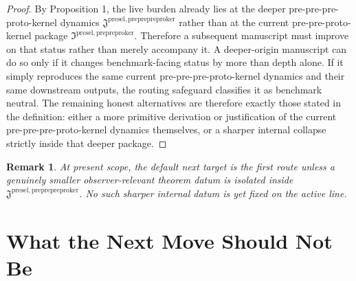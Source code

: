 \documentclass[11pt]{article}
\newcommand{\PrePrePreProtoKernelPackage}{\mathfrak J^{\mathrm{presel,preprepreproker}}}
\newcommand{\PrePreProtoKernelPackage}{\mathfrak I^{\mathrm{presel,prepreproker}}}
\newtheorem{remark}{Remark}
\begin{document}
\begin{proof}
By Proposition 1, the live burden already lies at the deeper pre-pre-pre-proto-kernel dynamics \(\PrePrePreProtoKernelPackage\) rather than at the current pre-pre-proto-kernel package \(\PrePreProtoKernelPackage\). Therefore a subsequent manuscript must improve on that status rather than merely accompany it. A deeper-origin manuscript can do so only if it changes benchmark-facing status by more than depth alone. If it simply reproduces the same current pre-pre-pre-proto-kernel dynamics and their same downstream outputs, the routing safeguard classifies it as benchmark neutral. The remaining honest alternatives are therefore exactly those stated in the definition: either a more primitive derivation or justification of the current pre-pre-pre-proto-kernel dynamics themselves, or a sharper internal collapse strictly inside that deeper package.
\end{proof}

\begin{remark}
At present scope, the default next target is the first route unless a genuinely smaller observer-relevant theorem datum is isolated inside \(\PrePrePreProtoKernelPackage\). No such sharper internal datum is yet fixed on the active line.
\end{remark}

\section{What the Next Move Should Not Be}
\end{document}
